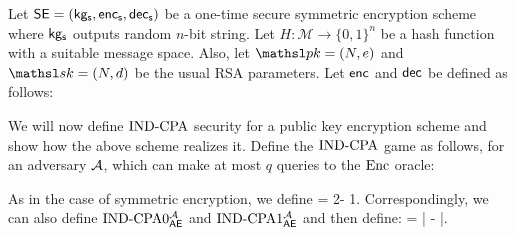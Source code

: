 Let $\textnormal{\textsf{SE}} = (\mathsf{kg_s},\mathsf{enc_s},\mathsf{dec_s})$ be a one-time secure symmetric encryption scheme where $\mathsf{kg_s}$ outputs random $n$-bit string. Let $H: \mathcal{M}\to \{0, 1\}^n$ be a hash function with a suitable message space. Also, let $\pk = (N, e)$ and $\sk = (N, d)$ be the usual RSA parameters. Let ${\sf enc}$ and ${\sf dec}$ be defined as follows:
\begin{center}
\end{center}
We will now define $\textnormal{IND-CPA}$ security for a public key encryption scheme and show how the above scheme realizes it. Define the $\textnormal{IND-CPA}$ game as follows, for an adversary ${\mathcal A}$, which can make at most $q$ queries to the $\textnormal{Enc}$ oracle:
\begin{center}
\end{center}
As in the case of symmetric encryption, we define
\bnm
  \AdvINDCPA{\AEnc}{\advA} =  2\cdot \Pr[\INDCPA_\AEnc^\advA \implies \true] - 1.
\enm
Correspondingly, we can also define $\textnormal{IND-CPA}0_{\textsf{AE}}^{\mathcal A}$ and $\textnormal{IND-CPA}1_{\textsf{AE}}^{\mathcal A}$ and then define:
 \bnm
  \AdvINDCPA{\AEnc}{\advA} = |  -  |.  
\enm \\

